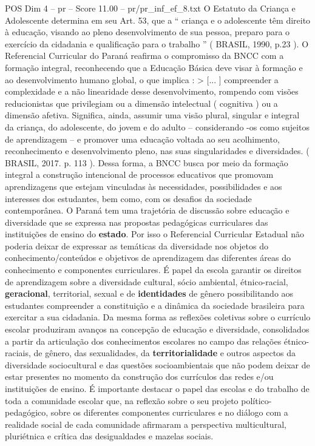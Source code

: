 \begin{textsample}{POS Dim 4 – pr – Score 11.00 – pr/pr\_inf\_ef\_8.txt}
O Estatuto da Criança e Adolescente determina em seu Art. 53, que a “ criança e o adolescente têm direito à educação, visando ao pleno desenvolvimento de sua pessoa, preparo para o exercício da cidadania e qualificação para o trabalho ” ( BRASIL, 1990, p.23 ).
O Referencial Curricular do Paraná reafirma o compromisso da BNCC com a formação integral, reconhecendo que a Educação Básica deve visar à formação e ao desenvolvimento humano global, o que implica : > [... ] compreender a complexidade e a não linearidade desse desenvolvimento, rompendo com visões reducionistas que privilegiam ou a dimensão intelectual ( cognitiva ) ou a dimensão afetiva.
Significa, ainda, assumir uma visão plural, singular e integral da criança, do adolescente, do jovem e do adulto – considerando -os como sujeitos de aprendizagem – e promover uma educação voltada ao seu acolhimento, reconhecimento e desenvolvimento pleno, nas suas singularidades e diversidades. ( BRASIL, 2017. p. 113 ).
Dessa forma, a BNCC busca por meio da formação integral a construção intencional de processos educativos que promovam aprendizagens que estejam vinculadas às necessidades, possibilidades e aos interesses dos estudantes, bem como, com os desafios da sociedade contemporânea.
O Paraná tem uma trajetória de discussão sobre educação e diversidade que se expressa nas propostas pedagógicas curriculares das instituições de ensino do \textbf{estado}.
Por isso o Referencial Curricular Estadual não poderia deixar de expressar as temáticas da diversidade nos objetos do conhecimento/conteúdos e objetivos de aprendizagem das diferentes áreas do conhecimento e componentes curriculares.
É papel da escola garantir os direitos de aprendizagem sobre a diversidade cultural, sócio ambiental, étnico-racial, \textbf{geracional}, territorial, sexual e de \textbf{identidades} de gênero possibilitando aos estudantes compreender a constituição e a dinâmica da sociedade brasileira para exercitar a sua cidadania.
Da mesma forma as reflexões coletivas sobre o currículo escolar produziram avanços na concepção de educação e diversidade, consolidados a partir da articulação dos conhecimentos escolares no campo das relações étnico-raciais, de gênero, das sexualidades, da \textbf{territorialidade} e outros aspectos da diversidade sociocultural e das questões socioambientais que não podem deixar de estar presentes no momento da construção dos currículos das redes e/ou instituições de ensino.
É importante destacar o papel das escolas e do trabalho de toda a comunidade escolar que, na reflexão sobre o seu projeto político-pedagógico, sobre os diferentes componentes curriculares e no diálogo com a realidade social de cada comunidade afirmaram a perspectiva multicultural, pluriétnica e crítica das desigualdades e mazelas sociais.

\end{textsample}
